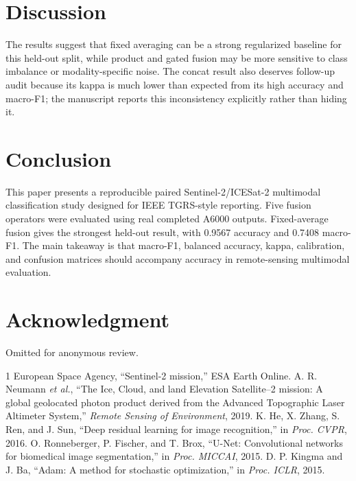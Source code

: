 \documentclass[journal]{IEEEtran}
\begin{document}
\section{Discussion}
The results suggest that fixed averaging can be a strong regularized baseline for this held-out split, while product and gated fusion may be more sensitive to class imbalance or modality-specific noise. The concat result also deserves follow-up audit because its kappa is much lower than expected from its high accuracy and macro-F1; the manuscript reports this inconsistency explicitly rather than hiding it.

\section{Conclusion}
This paper presents a reproducible paired Sentinel-2/ICESat-2 multimodal classification study designed for IEEE TGRS-style reporting. Five fusion operators were evaluated using real completed A6000 outputs. Fixed-average fusion gives the strongest held-out result, with 0.9567 accuracy and 0.7408 macro-F1. The main takeaway is that macro-F1, balanced accuracy, kappa, calibration, and confusion matrices should accompany accuracy in remote-sensing multimodal evaluation.

\section*{Acknowledgment}
Omitted for anonymous review.

\begin{thebibliography}{1}
 European Space Agency, ``Sentinel-2 mission,'' ESA Earth Online.
 A. R. Neumann \emph{et al.}, ``The Ice, Cloud, and land Elevation Satellite--2 mission: A global geolocated photon product derived from the Advanced Topographic Laser Altimeter System,'' \emph{Remote Sensing of Environment}, 2019.
 K. He, X. Zhang, S. Ren, and J. Sun, ``Deep residual learning for image recognition,'' in \emph{Proc. CVPR}, 2016.
 O. Ronneberger, P. Fischer, and T. Brox, ``U-Net: Convolutional networks for biomedical image segmentation,'' in \emph{Proc. MICCAI}, 2015.
 D. P. Kingma and J. Ba, ``Adam: A method for stochastic optimization,'' in \emph{Proc. ICLR}, 2015.
\end{thebibliography}
\end{document}
